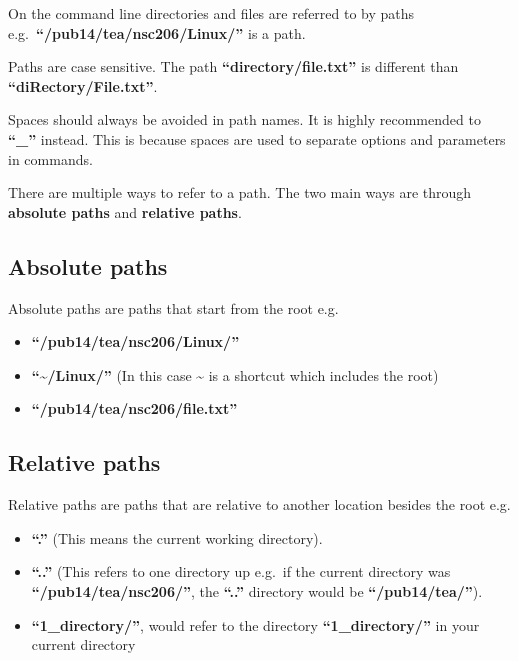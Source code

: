 \documentclass[
  letterpaper,
  DIV=11,
  numbers=noendperiod]{scrreprt}
\providecommand{\tightlist}{%
  \setlength{\itemsep}{0pt}\setlength{\parskip}{0pt}}\usepackage{longtable,booktabs,array}
\begin{document}
On the command line directories and files are referred to by paths
e.g.~\textbf{``/pub14/tea/nsc206/Linux/''} is a path.

Paths are case sensitive. The path \textbf{``directory/file.txt''} is
different than \textbf{``diRectory/File.txt''}.

Spaces should always be avoided in path names. It is highly recommended
to \textbf{``\_''} instead. This is because spaces are used to separate
options and parameters in commands.

There are multiple ways to refer to a path. The two main ways are
through \textbf{absolute paths} and \textbf{relative paths}.

\hypertarget{absolute-paths}{%
\subsection{Absolute paths}\label{absolute-paths}}

Absolute paths are paths that start from the root e.g.

\begin{itemize}
\tightlist
\item
  \textbf{``/pub14/tea/nsc206/Linux/''}
\item
  \textbf{``\textasciitilde/Linux/''} (In this case \textasciitilde{} is
  a shortcut which includes the root)
\item
  \textbf{``/pub14/tea/nsc206/file.txt''}
\end{itemize}

\hypertarget{relative-paths}{%
\subsection{Relative paths}\label{relative-paths}}

Relative paths are paths that are relative to another location besides
the root e.g.

\begin{itemize}
\tightlist
\item
  \textbf{``.''} (This means the current working directory).
\item
  \textbf{``..''} (This refers to one directory up e.g.~if the current
  directory was \textbf{``/pub14/tea/nsc206/''}, the \textbf{``..''}
  directory would be \textbf{``/pub14/tea/''}).
\item
  \textbf{``1\_directory/''}, would refer to the directory
  \textbf{``1\_directory/''} in your current directory
\end{itemize}
\end{document}
